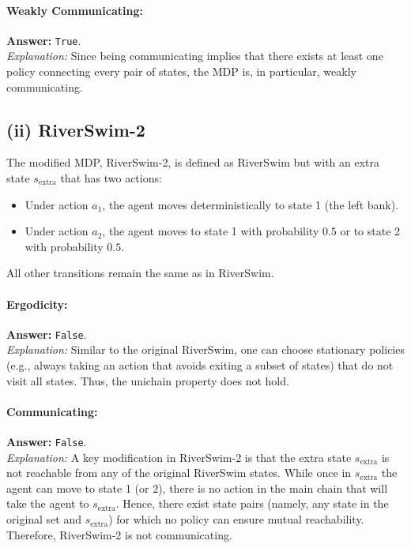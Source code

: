 \paragraph{Weakly Communicating:}  
\textbf{Answer:} \texttt{True}.\\[0.5em]
\textit{Explanation:}  
Since being communicating implies that there exists at least one policy connecting every pair of states, the MDP is, in particular, weakly communicating.

\medskip

\subsection*{(ii) RiverSwim-2}

The modified MDP, RiverSwim-2, is defined as RiverSwim but with an extra state $s_{\text{extra}}$ that has two actions:
\begin{itemize}
    \item Under action $a_1$, the agent moves deterministically to state 1 (the left bank).
    \item Under action $a_2$, the agent moves to state 1 with probability $0.5$ or to state 2 with probability $0.5$.
\end{itemize}
All other transitions remain the same as in RiverSwim.

\paragraph{Ergodicity:}  
\textbf{Answer:} \texttt{False}.\\[0.5em]
\textit{Explanation:}  
Similar to the original RiverSwim, one can choose stationary policies (e.g., always taking an action that avoids exiting a subset of states) that do not visit all states. Thus, the unichain property does not hold.

\paragraph{Communicating:}  
\textbf{Answer:} \texttt{False}.\\[0.5em]
\textit{Explanation:}  
A key modification in RiverSwim-2 is that the extra state $s_{\text{extra}}$ is not reachable from any of the original RiverSwim states. While once in $s_{\text{extra}}$ the agent can move to state 1 (or 2), there is no action in the main chain that will take the agent to $s_{\text{extra}}$. Hence, there exist state pairs (namely, any state in the original set and $s_{\text{extra}}$) for which no policy can ensure mutual reachability. Therefore, RiverSwim-2 is not communicating.

